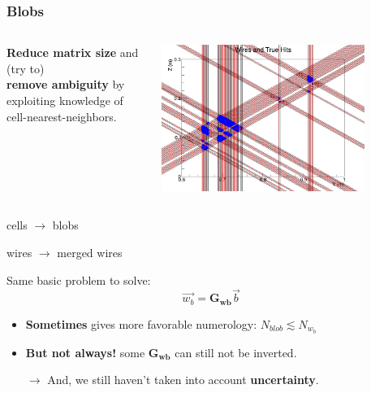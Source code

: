 \begin{frame}
  \frametitle{Blobs}

  \begin{columns}
    \begin{column}{0.6\textwidth}
      \textbf{Reduce matrix size} and (try to) \\
      \textbf{remove ambiguity} by exploiting knowledge
      of cell-nearest-neighbors.
    \end{column}
    \begin{column}{0.4\textwidth}
      \includegraphics[width=0.8\textwidth]{wires-and-true-hits.png}          
    \end{column}
  \end{columns}

  \begin{center}
    cells $\to$ blobs

    wires $\to$ merged wires
  \end{center}

  Same basic problem to solve:
  \[\vec{w_b} = \mathbf{G_{wb}} \vec{b}\]

  \begin{itemize}
  \item \textbf{Sometimes} gives more favorable numerology: $N_{blob} \lesssim N_{w_b}$
  \item \textbf{But not always!} some $\mathbf{G_{wb}}$ can still not be inverted.
  \item[$\rightarrow$] And, we still haven't taken into account \textbf{uncertainty}.
  \end{itemize}
\end{frame}

